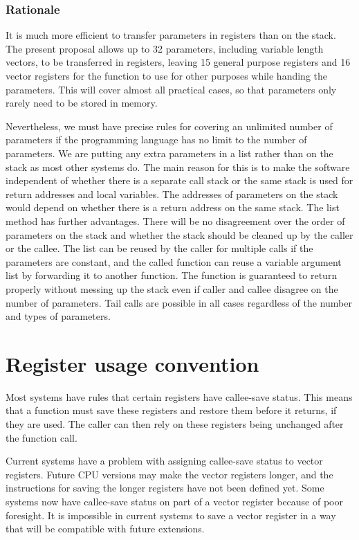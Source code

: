 \documentclass[forwardcom.tex]{subfiles}
\begin{document}
\subsubsection{Rationale}
It is much more efficient to transfer parameters in registers than on the stack. The present proposal allows up to 32 parameters, including variable length vectors, to be transferred in registers, leaving 15 general purpose registers and 16 vector registers for the function to use for other purposes while handing the parameters. This will cover almost all practical cases, so that parameters only rarely need to be stored in memory. 
\vspace{2mm}

Nevertheless, we must have precise rules for covering an unlimited number of parameters if the programming language has no limit to the number of parameters. We are putting any extra parameters in a list rather than on the stack as most other systems do. The main reason for this is to make the software independent of whether there is a separate call stack or the same stack is used for return addresses and local variables. The addresses of parameters on the stack would depend on whether there is a return address on the same stack. The list method has further advantages. There will be no disagreement over the order of parameters on the stack and whether the stack should be cleaned up by the caller or the callee. The list can be reused by the caller for multiple calls if the parameters are constant, and the called function can reuse a variable argument list by forwarding it to another function. The function is guaranteed to return properly without messing up the stack even if caller and callee disagree on the number of parameters. Tail calls are possible in all cases regardless of the number and types of parameters. 
\vspace{2mm}

\section{Register usage convention} \label{registerUsageConvention}
Most systems have rules that certain registers have callee-save status. This means that a function must save these registers and restore them before it returns, if they are used. The caller can then rely on these registers being unchanged after the function call.
\vspace{2mm}

Current systems have a problem with assigning callee-save status to vector registers. Future CPU versions may make the vector registers longer, and the instructions for saving the longer registers have not been defined yet. Some systems now have callee-save status on part of a vector register because of poor foresight. It is impossible in current systems to save a vector register in a way that will be compatible with future extensions. 
\vspace{2mm}
\end{document}
